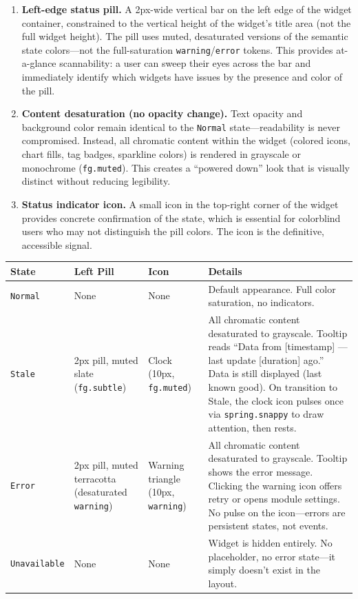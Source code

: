 \documentclass[11pt,a4paper]{article}
\begin{document}
\begin{enumerate}[leftmargin=1.5em, itemsep=3pt]
  \item \textbf{Left-edge status pill.} A 2px-wide vertical bar on the left edge of the widget container, constrained to the vertical height of the widget's title area (not the full widget height). The pill uses muted, desaturated versions of the semantic state colors---not the full-saturation \texttt{warning}/\texttt{error} tokens. This provides at-a-glance scannability: a user can sweep their eyes across the bar and immediately identify which widgets have issues by the presence and color of the pill.

  \item \textbf{Content desaturation (no opacity change).} Text opacity and background color remain identical to the \texttt{Normal} state---readability is never compromised. Instead, all chromatic content within the widget (colored icons, chart fills, tag badges, sparkline colors) is rendered in grayscale or monochrome (\texttt{fg.muted}). This creates a ``powered down'' look that is visually distinct without reducing legibility.

  \item \textbf{Status indicator icon.} A small icon in the top-right corner of the widget provides concrete confirmation of the state, which is essential for colorblind users who may not distinguish the pill colors. The icon is the definitive, accessible signal.
\end{enumerate}

\begin{longtable}{p{2.2cm} p{2.5cm} p{2cm} p{6.5cm}}
\toprule
\textbf{State} & \textbf{Left Pill} & \textbf{Icon} & \textbf{Details} \\
\midrule
\texttt{Normal} & None & None & Default appearance. Full color saturation, no indicators. \\
\addlinespace
\texttt{Stale} & 2px pill, muted slate (\texttt{fg.subtle}) & Clock (10px, \texttt{fg.muted}) & All chromatic content desaturated to grayscale. Tooltip reads ``Data from [timestamp] --- last update [duration] ago.'' Data is still displayed (last known good). On transition to Stale, the clock icon pulses once via \texttt{spring.snappy} to draw attention, then rests. \\
\addlinespace
\texttt{Error} & 2px pill, muted terracotta (desaturated \texttt{warning}) & Warning triangle (10px, \texttt{warning}) & All chromatic content desaturated to grayscale. Tooltip shows the error message. Clicking the warning icon offers retry or opens module settings. No pulse on the icon---errors are persistent states, not events. \\
\addlinespace
\texttt{Unavailable} & None & None & Widget is hidden entirely. No placeholder, no error state---it simply doesn't exist in the layout. \\
\bottomrule
\end{longtable}
\end{document}

